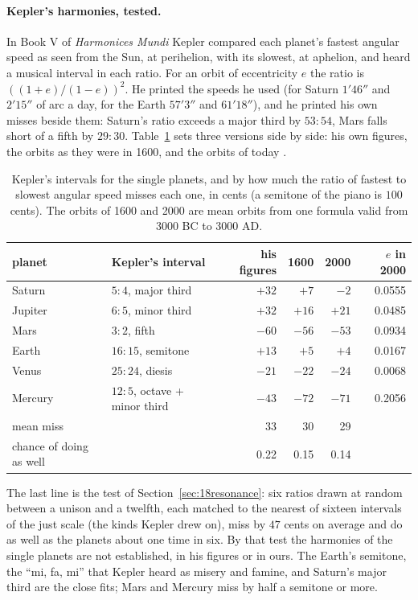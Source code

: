\paragraph{Kepler's harmonies, tested.} In Book V of \emph{Harmonices Mundi} \cite{kepler1619} Kepler
compared each planet's fastest angular speed as seen from the Sun, at perihelion, with its slowest, at
aphelion, and heard a musical interval in each ratio. For an orbit of eccentricity $e$ the ratio is
$((1+e)/(1-e))^{2}$. He printed the speeds he used (for Saturn $1'46''$ and $2'15''$ of arc a day, for the
Earth $57'3''$ and $61'18''$), and he printed his own misses beside them: Saturn's ratio exceeds a major
third by $53:54$, Mars falls short of a fifth by $29:30$. Table~\ref{tab:18harm} sets three versions side
by side: his own figures, the orbits as they were in 1600, and the orbits of today \cite{standish1992}.

\begin{table}[ht]
\centering
\caption{Kepler's intervals for the single planets, and by how much the ratio of fastest to slowest
angular speed misses each one, in cents (a semitone of the piano is $100$ cents). The orbits of 1600 and
2000 are mean orbits from one formula valid from 3000 BC to 3000 AD.}\label{tab:18harm}
\small
\begin{tabular}{llrrrr}
\hline
planet & Kepler's interval & his figures & 1600 & 2000 & $e$ in 2000\\
\hline
Saturn & $5:4$, major third & $+32$ & $+7$ & $-2$ & 0.0555\\
Jupiter & $6:5$, minor third & $+32$ & $+16$ & $+21$ & 0.0485\\
Mars & $3:2$, fifth & $-60$ & $-56$ & $-53$ & 0.0934\\
Earth & $16:15$, semitone & $+13$ & $+5$ & $+4$ & 0.0167\\
Venus & $25:24$, diesis & $-21$ & $-22$ & $-24$ & 0.0068\\
Mercury & $12:5$, octave + minor third & $-43$ & $-72$ & $-71$ & 0.2056\\
\hline
mean miss & & 33 & 30 & 29 & \\
chance of doing as well & & 0.22 & 0.15 & 0.14 & \\
\hline
\end{tabular}
\end{table}

The last line is the test of Section~\ref{sec:18resonance}: six ratios drawn at random between a unison
and a twelfth, each matched to the nearest of sixteen intervals of the just scale (the kinds Kepler drew
on), miss by $47$ cents on average and do as well as the planets about one time in six. By that test the
harmonies of the single planets are not established, in his figures or in ours. The Earth's semitone,
the ``mi, fa, mi'' that Kepler heard as misery and famine, and Saturn's major third are the close fits;
Mars and Mercury miss by half a semitone or more.

